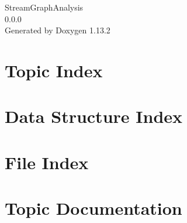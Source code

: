 \documentclass[twoside]{book}
\newcommand{\+}{\discretionary{\mbox{\scriptsize$\hookleftarrow$}}{}{}}
\newcommand{\clearemptydoublepage}{%
    \newpage{\pagestyle{empty}\cleardoublepage}%
  }
\begin{document}
  \raggedbottom
    \hypersetup{pageanchor=false,
                bookmarksnumbered=true,
                pdfencoding=unicode
               }
  \begin{titlepage}
  \vspace*{7cm}
  \begin{center}%
  {\Large Stream\+Graph\+Analysis}\\
  [1ex]\large 0.\+0.\+0 \\
  \vspace*{1cm}
  {\large Generated by Doxygen 1.13.2}\\
  \end{center}
  \end{titlepage}
  \clearemptydoublepage
  \tableofcontents
  \clearemptydoublepage
  \hypersetup{pageanchor=true}


\chapter{Topic Index}

\chapter{Data Structure Index}

\chapter{File Index}

\chapter{Topic Documentation}



\end{document}
